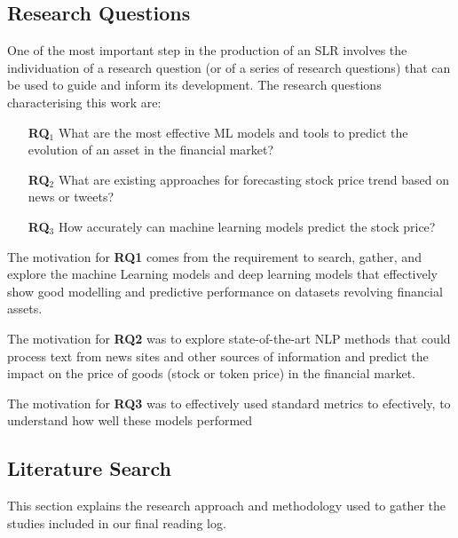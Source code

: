 \documentclass[11pt]{article}
\begin{document}
\subsection{Research Questions} \label{S:ResearchQuestions}

One of the most important step in the production of an SLR involves the individuation of a research question (or of a series of research questions) that can be used to guide and inform its development. The research questions characterising this work are:


\begin{enumerate}\label{T:researchQuestions}

\item [\textbf{RQ}$_1$]What are the most effective ML models and tools to predict the evolution of an asset in the financial market? \label{Word:RQ1}

\item [\textbf{RQ}$_2$]{What are existing approaches for forecasting stock price trend based on news or tweets?
}\label{Word:RQ2}

\item [\textbf{RQ}$_3$]{How accurately can machine learning models predict the stock price?
}\label{Word:RQ3}
\end{enumerate}


The motivation for \textbf{RQ1} comes from the requirement to search, gather, and explore  the machine Learning models and deep learning models that effectively show good modelling and predictive performance on datasets revolving financial assets.

The motivation for \textbf{RQ2} was to explore state-of-the-art NLP methods that could process text from news sites and other sources of information and predict the impact on the price of goods (stock or token price) in the financial market.

The motivation for \textbf{RQ3} was to effectively used standard metrics to efectively, to understand how well these models performed

\subsection{Literature Search}\label{S:literatureSearch}
This section explains the research approach and methodology used to gather the studies included in our final reading log. 
\end{document}
